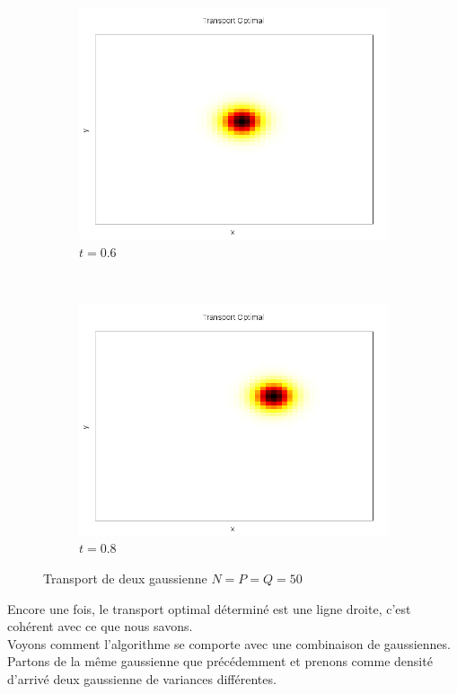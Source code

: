 \documentclass[a4paper,12pt]{article}
\begin{document}
\begin{figure}[!h]
\begin{subfigure}[b]{0.22\linewidth}
	\includegraphics[width=\textwidth]{img/2DGaussian/C_00030.png}
	\caption{$t=0.6$}
	\end{subfigure}
	~
	\begin{subfigure}[b]{0.22\linewidth}
	\includegraphics[width=\textwidth]{img/2DGaussian/C_00040.png}
	\caption{$t=0.8$}
	\end{subfigure}
	\caption{Transport de deux gaussienne $N=P=Q=50$}
\end{figure}

Encore une fois, le transport optimal déterminé est une ligne droite, c'est cohérent avec ce que nous savons. \\ 
Voyons comment l'algorithme se comporte avec une combinaison de gaussiennes. Partons de la même gaussienne que précédemment et prenons comme densité d'arrivé deux gaussienne de variances différentes. 
\end{document}
